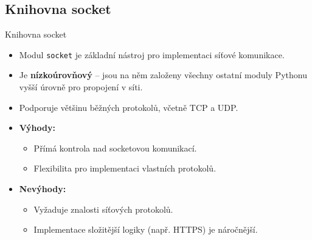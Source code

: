 \documentclass{beamer}
\begin{document}
\subsection{Knihovna socket}
\begin{frame}{Knihovna socket}
	\begin{itemize}
		\item Modul \texttt{socket} je základní nástroj pro implementaci síťové komunikace.
		\item Je \textbf{nízkoúrovňový} – jsou na něm založeny všechny ostatní moduly Pythonu vyšší úrovně pro propojení v síti.
		\item Podporuje většinu běžných protokolů, včetně TCP a UDP.
		\item \textbf{Výhody:}
		\begin{itemize}
			\item Přímá kontrola nad socketovou komunikací.
			\item Flexibilita pro implementaci vlastních protokolů.
		\end{itemize}
		\item \textbf{Nevýhody:}
		\begin{itemize}
			\item Vyžaduje znalosti síťových protokolů.
			\item Implementace složitější logiky (např. HTTPS) je náročnější.
		\end{itemize}
	\end{itemize}
\end{frame}
\end{document}
